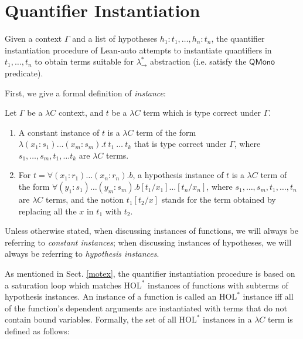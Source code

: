 \section{Quantifier Instantiation}\label{sectinst}
Given a context $\Gamma$ and a list of hypotheses $h_1 : t_1, \dots, h_n : t_n$, the quantifier
instantiation procedure of Lean-auto attempts to instantiate quantifiers in
$t_1, \dots, t_n$ to obtain terms suitable for $\lambda_\to^*$ abstraction (i.e. satisfy the $\mathsf{QMono}$ predicate).

First, we give a formal definition of \textit{instance}:

\begin{definition}
  Let $\Gamma$ be a $\lambda C$ context, and $t$ be a $\lambda C$ term which is type correct under $\Gamma$.
  \begin{enumerate}
    \item A constant instance of $t$ is a $\lambda C$ term of the
      form $\lambda (x_1 : s_1) \dots (x_m : s_m). t \ t_1 \ \dots \ t_k$ that is
      type correct under $\Gamma$, where $s_1, \dots, s_m, t_1, \dots t_k$ are $\lambda C$ terms.
    \item For $t = \forall (x_1 : r_1) \dots (x_n : r_n). b$, a hypothesis instance of
      $t$ is a $\lambda C$ term of the form $\forall (y_1 : s_1) \dots (y_m : s_m). b[t_1/x_1]\dots[t_n/x_n]$,
      where $s_1, \dots, s_m, t_1, \dots, t_n$ are $\lambda C$ terms, and the notion $t_1[t_2/x]$ stands
      for the term obtained by replacing all the $x$ in $t_1$ with $t_2$.
  \end{enumerate}
\end{definition}

Unless otherwise stated, when discussing instances of functions, we will always be
referring to \textit{constant instances}; when discussing instances of hypotheses, we will
always be referring to \textit{hypothesis instances}.

As mentioned in Sect. \ref{motex}, the quantifier instantiation procedure
is based on a saturation loop which matches $\text{HOL}^*$ instances of functions
with subterms of hypothesis instances. An instance of a function is called
an $\text{HOL}^*$ instance iff all of the function's dependent arguments are instantiated with terms
that do not contain bound variables. Formally, the set of all $\text{HOL}^*$ instances
in a $\lambda C$ term is defined as follows:


